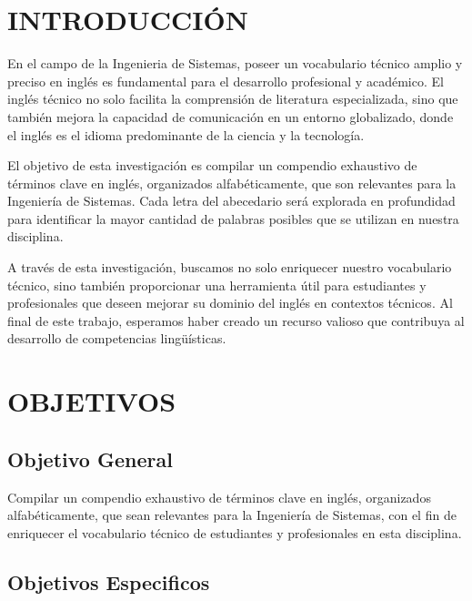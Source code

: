 \section{INTRODUCCIÓN}

    En el campo de la Ingenieria de Sistemas, poseer un vocabulario técnico amplio y preciso en inglés es fundamental para el desarrollo profesional y académico. El inglés técnico no solo facilita la comprensión de literatura especializada, sino que también mejora la capacidad de comunicación en un entorno globalizado, donde el inglés es el idioma predominante de la ciencia y la tecnología.
    
    El objetivo de esta investigación es compilar un compendio exhaustivo de términos clave en inglés, organizados alfabéticamente, que son relevantes para la Ingeniería de Sistemas. Cada letra del abecedario será explorada en profundidad para identificar la mayor cantidad de palabras posibles que se utilizan en nuestra disciplina.
    
    A través de esta investigación, buscamos no solo enriquecer nuestro vocabulario técnico, sino también proporcionar una herramienta útil para estudiantes y profesionales que deseen mejorar su dominio del inglés en contextos técnicos. Al final de este trabajo, esperamos haber creado un recurso valioso que contribuya al desarrollo de competencias lingüísticas.

\section{OBJETIVOS}

    \subsection{Objetivo General}
        
        Compilar un compendio exhaustivo de términos clave en inglés, organizados alfabéticamente, que sean relevantes para la Ingeniería de Sistemas, con el fin de enriquecer el vocabulario técnico de estudiantes y profesionales en esta disciplina.

    \subsection{Objetivos Especificos}

